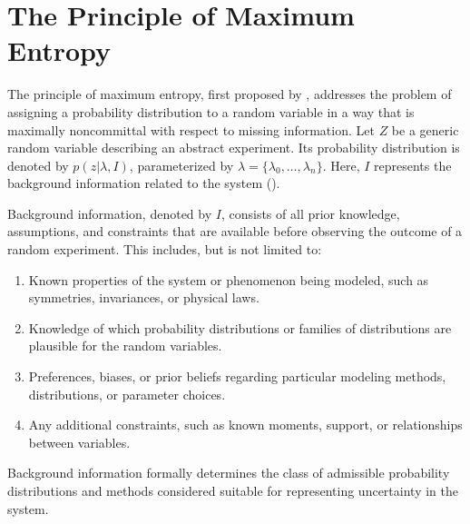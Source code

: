 \section{The Principle of Maximum Entropy}
\label{sec:maxent}
The principle of maximum entropy, first proposed by \citet{Jaynes1957}, addresses the problem of assigning a probability distribution to a random variable in a way that is maximally noncommittal with respect to missing information. Let $Z$ be a generic random variable describing an abstract experiment. Its probability distribution is denoted by $p(z|\lambda, I)$, parameterized by $\lambda = \{\lambda_0, \dots, \lambda_n\}$. Here, $I$ represents the background information related to the system ().
\newpage
\begin{definition}
	\label{def:background_information}
	Background information, denoted by $I$, consists of all prior knowledge, assumptions, and constraints that are available before observing the outcome of a random experiment. This includes, but is not limited to:
	\begin{enumerate}
		\item Known properties of the system or phenomenon being modeled, such as symmetries, invariances, or physical laws.
		\item Knowledge of which probability distributions or families of distributions are plausible for the random variables.
		\item Preferences, biases, or prior beliefs regarding particular modeling methods, distributions, or parameter choices.
		\item Any additional constraints, such as known moments, support, or relationships between variables.
	\end{enumerate}
	Background information formally determines the class of admissible probability distributions and methods considered suitable for representing uncertainty in the system.
\end{definition}

